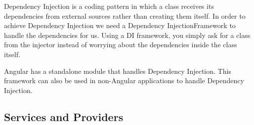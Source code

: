 \documentclass[12pt,]{article}
\begin{document}
Dependency Injection is a coding pattern in which a class receives its
dependencies from external sources rather than creating them itself. In
order to achieve Dependency Injection we need a Dependency
InjectionFramework to handle the dependencies for us. Using a DI
framework, you simply ask for a class from the injector instead of
worrying about the dependencies inside the class itself.

Angular has a standalone module that handles Dependency Injection. This
framework can also be used in non-Angular applications to handle
Dependency Injection.

\subsection{Services and Providers}\label{services-and-providers}
\end{document}

